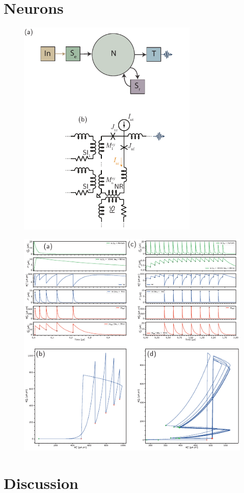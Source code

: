 \documentclass[twocolumn]{article}
\begin{document}
\section{\label{sec:neurons}Neurons}

\begin{figure}[h!]
\includegraphics[width=8.6cm]{figures/_fig__point_neuron__schematic__circuit.pdf}
\end{figure}

\begin{figure}[h!]
\includegraphics[width=17.2cm]{figures/_fig__point_neuron__one_synapse.pdf}
\end{figure}

\section{\label{sec:discussion}Discussion}





\end{document}
